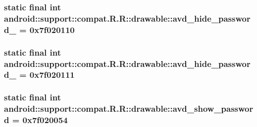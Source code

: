 \hypertarget{classandroid_1_1support_1_1compat_1_1_r_1_1drawable_65d50964b8aa7385f867a7e77e4d64f7}{
\subsubsection[{avd\_\-hide\_\-password\_\-2}]{\setlength{\rightskip}{0pt plus 5cm}static final int android::support::compat.R.R::drawable::avd\_\-hide\_\-password\_ = 0x7f020110}}
\label{classandroid_1_1support_1_1compat_1_1_r_1_1drawable_65d50964b8aa7385f867a7e77e4d64f7}


\hypertarget{classandroid_1_1support_1_1compat_1_1_r_1_1drawable_5b4042848ddabab7040d9745a5db4c7a}{
\subsubsection[{avd\_\-hide\_\-password\_\-3}]{\setlength{\rightskip}{0pt plus 5cm}static final int android::support::compat.R.R::drawable::avd\_\-hide\_\-password\_ = 0x7f020111}}
\label{classandroid_1_1support_1_1compat_1_1_r_1_1drawable_5b4042848ddabab7040d9745a5db4c7a}


\hypertarget{classandroid_1_1support_1_1compat_1_1_r_1_1drawable_7ca163433c0c472a8a3cf04d545a54f3}{
\subsubsection[{avd\_\-show\_\-password}]{\setlength{\rightskip}{0pt plus 5cm}static final int android::support::compat.R.R::drawable::avd\_\-show\_\-password = 0x7f020054}}
\label{classandroid_1_1support_1_1compat_1_1_r_1_1drawable_7ca163433c0c472a8a3cf04d545a54f3}


